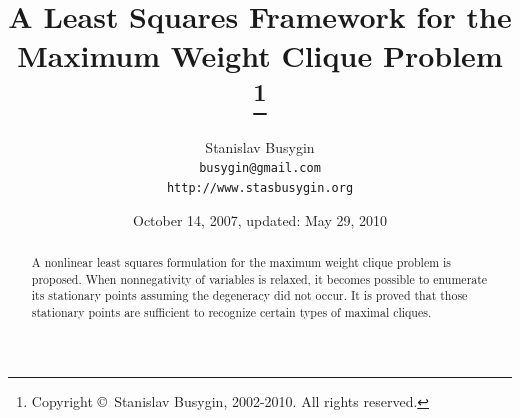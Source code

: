 \documentclass[11pt]{article}
\begin{document}
\title{A Least Squares Framework for the Maximum Weight Clique Problem
\thanks{Copyright \copyright \ Stanislav Busygin, 2002-2010. All rights reserved.}}

\author{Stanislav Busygin \\
{\tt busygin@gmail.com} \\
{\tt http://www.stasbusygin.org}}

\date{October 14, 2007, updated: May 29, 2010}

\maketitle

% 

\begin{abstract}
A nonlinear least squares formulation for the maximum weight clique problem
is proposed. When nonnegativity of variables is relaxed, it becomes possible
to enumerate its stationary points assuming the degeneracy did not occur.
It is proved that those stationary points are sufficient to recognize certain
types of maximal cliques.
\end{abstract}
\end{document}
